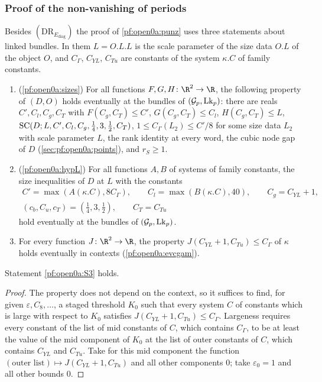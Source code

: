 \subsubsection{Proof of the non-vanishing of periods}
Besides $(\mathrm{DR}_{E_{\mathrm{diag}}})$ the proof of \cref{pf:open0a:punz} uses three statements about linked
bundles. In them $L=O.L.L$ is the scale parameter of the size data $O.L$ of the object $O$, and $C_\Gamma$, $C_{YL}$,
$C_{Tu}$ are constants of the system $\kappa.C$ of family constants.

\begin{enumerate}[label=(S\arabic*),leftmargin=*]
\item\label{pf:open0a:S1} (\cref{pf:open0a:sizes}) For all functions
$F,G,H\colon\R^2\to\R$, the following property of $(D,O)$ holds eventually at the bundles of
$(\mathcal G_p,\mathrm{Lk}_p)$: there are reals $C',C_l,C_g,C_T$ with $F(C_g,C_T)\le C'$, $G(C_g,C_T)\le C_l$,
$H(C_g,C_T)\le L$, $\mathrm{SC}(D;L,C',C_l,C_g,\frac14,3,\frac12,C_T)$, $1\le C_\Gamma(L_2)\le C'/8$ for some size data
$L_2$ with scale parameter $L$, the rank identity at every word, the cubic node gap of $D$ (\cref{sec:pf:open0a:points}),
and $r_S\ge1$.
\item\label{pf:open0a:S2} (\cref{pf:open0a:hypL}) For all functions $A,B$ of
systems of family constants, the size inequalities of $D$ at $L$ with the constants
\begin{gather*}
C'=\max(A(\kappa.C),8C_\Gamma),\qquad C_l=\max(B(\kappa.C),40),\qquad C_g=C_{YL}+1,\\
(c_b,C_u,c_T)=(\tfrac14,3,\tfrac12),\qquad C_T=C_{Tu}
\end{gather*}
hold eventually at the bundles of $(\mathcal G_p,\mathrm{Lk}_p)$.
\item\label{pf:open0a:S3} For every function $J\colon\R^2\to\R$, the property $J(C_{YL}+1,C_{Tu})\le C_\Gamma$ of
$\kappa$ holds eventually in contexts (\cref{pf:open0a:evcgam}).
\end{enumerate}

\begin{lemma}\label{pf:open0a:evcgam}
Statement \ref{pf:open0a:S3} holds.
\end{lemma}

\begin{proof}
The property does not depend on the context, so it suffices to find, for given $\varepsilon,C_8,\dots$, a staged
threshold $K_0$ such that every system $C$ of constants which is large with respect to $K_0$ satisfies
$J(C_{YL}+1,C_{Tu})\le C_\Gamma$. Largeness requires every constant of the list of mid constants of $C$, which
contains $C_\Gamma$, to be at least the value of the mid component of $K_0$ at the list of outer constants of $C$,
which contains $C_{YL}$ and $C_{Tu}$. Take for this mid component the function
$(\text{outer list})\mapsto J(C_{YL}+1,C_{Tu})$ and all other components $0$; take $\varepsilon_0=1$ and all other
bounds $0$.
\end{proof}

